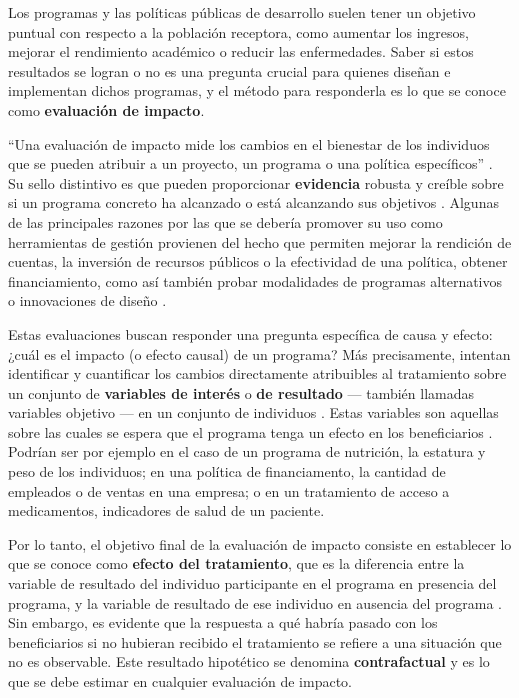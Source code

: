 \documentclass[../../main.tex]{subfiles}
\begin{document}
Los programas y las políticas públicas de desarrollo suelen tener un objetivo puntual con
respecto a la población receptora, como aumentar los ingresos, mejorar el rendimiento
académico o reducir las enfermedades\cite{gertler-2016}. Saber si estos resultados se
logran o no es una pregunta crucial para quienes diseñan e implementan dichos programas, y
el método para responderla es lo que se conoce como \textbf{evaluación de impacto}.

``Una evaluación de impacto mide los cambios en el bienestar de los individuos que se pueden
atribuir a un proyecto, un programa o una política específicos'' \cite{gertler-2016}. Su
sello distintivo es que pueden proporcionar \textbf{evidencia} robusta y creíble sobre si
un programa concreto ha alcanzado o está alcanzando sus objetivos \cite{gertler-2016}.
Algunas de las principales razones por las que se debería promover su uso como
herramientas de gestión provienen del hecho que permiten mejorar la rendición de cuentas,
la inversión de recursos públicos o la efectividad de una política, obtener
financiamiento, como así también probar modalidades de programas alternativos o
innovaciones de diseño \cite{gertler-2016}.

Estas evaluaciones buscan responder una pregunta específica de causa y efecto: ¿cuál es el
impacto (o efecto causal) de un programa? Más precisamente, intentan identificar y
cuantificar los cambios directamente atribuibles al tratamiento \cite{gertler-2016} sobre
un conjunto de \textbf{variables de interés} o \textbf{de resultado} — también llamadas
variables objetivo — en un conjunto de individuos \cite{bernal}. Estas variables son
aquellas sobre las cuales se espera que el programa tenga un efecto en los beneficiarios
\cite{bernal}. Podrían ser por ejemplo en el caso de un programa de nutrición, la estatura
y peso de los individuos; en una política de financiamento, la cantidad de empleados o de
ventas en una empresa; o en un tratamiento de acceso a medicamentos, indicadores de salud
de un paciente.

Por lo tanto, el objetivo final de la evaluación de impacto consiste en establecer lo que
se conoce como \textbf{efecto del tratamiento}, que es la diferencia entre la variable de
resultado del individuo participante en el programa en presencia del programa, y la
variable de resultado de ese individuo en ausencia del programa \cite{bernal}. Sin
embargo, es evidente que la respuesta a qué habría pasado con los beneficiarios si no
hubieran recibido el tratamiento se refiere a una situación que no es observable. Este
resultado hipotético se denomina \textbf{contrafactual} y es lo que se debe estimar en
cualquier evaluación de impacto.
\end{document}
